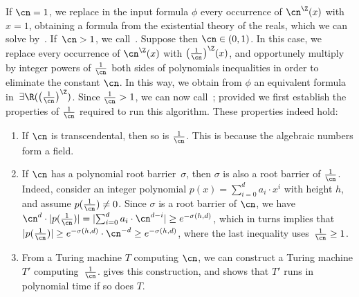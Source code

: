 If $\cn = 1$, we
replace in the input formula $\phi$ every occurrence of $\ipow{\cn}(x)$ with $x
= 1$, obtaining a formula from the existential theory of the reals, which we can
solve by~. If~$\cn > 1$, we
call~. Suppose then $\cn \in (0,1)$. In this case, we
replace every occurrence of $\ipow{\cn}(x)$ with
$\ipow{\big(\frac{1}{\cn}\big)}(x)$, and opportunely multiply by integer powers of
$\frac{1}{\cn}$ both sides of polynomials inequalities in order to eliminate the
constant $\cn$. In this way, we obtain from $\phi$ an equivalent formula
in~$\exists\R(\ipow{\big(\frac{1}{\cn}\big)})$. Since $\frac{1}{\cn} > 1$, we
can now call~; provided we first establish the
properties of $\frac{1}{\cn}$ required to run this algorithm. These properties
indeed hold:
\begin{enumerate}
  \item\label{small-bases:i2} If $\cn$ is transcendental, then so is
  $\frac{1}{\cn}$. This is because the algebraic numbers form a field.
  \item\label{small-bases:i3} If $\cn$ has a polynomial root barrier~$\sigma$,
  then $\sigma$ is also a root barrier of $\frac{1}{\cn}$. Indeed, consider an
  integer polynomial $p(x) = \sum_{i=0}^d a_i \cdot x^i$ with height $h$, and
  assume $p(\frac{1}{\cn}) \neq 0$. Since $\sigma$ is a root barrier of $\cn$,
  we have $\cn^d \cdot |{p(\frac{1}{\cn})}| = |{\sum_{i=0}^d a_i \cdot
  \cn^{d-i}}| \geq e^{-\sigma(h,d)}$, which in turns implies that
  $|{p(\frac{1}{\cn})}| \geq e^{-\sigma(h,d)} \cdot \cn^{-d} \geq
  e^{-\sigma(h,d)}$, where the last inequality uses~$\frac{1}{\cn} \geq 1$.
  \item\label{small-bases:i1} From a Turing machine $T$ computing $\cn$, we can
  construct a Turing machine $T'$ computing~$\frac{1}{\cn}$.
   gives this construction, and shows that
  $T'$ runs in polynomial time if so does $T$. 
\end{enumerate} 
